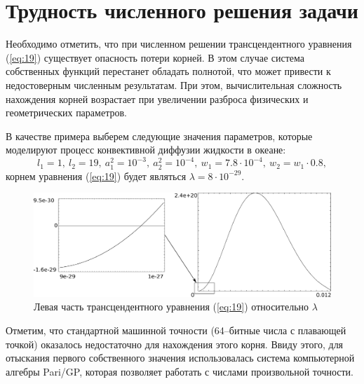 \documentclass[12pt, a4paper]{article}
\begin{document}
\section{Трудность численного решения задачи}
Необходимо отметить, что при численном решении трансцендентного уравнения (\ref{eq:19}) существует опасность потери корней.
В этом случае система собственных функций перестанет обладать полнотой, что может привести к недостоверным численным результатам.
При этом, вычислительная сложность нахождения корней возрастает при увеличении разброса физических и геометрических параметров.

В качестве примера выберем следующие значения параметров, которые моделируют процесс конвективной диффузии жидкости в океане:
\begin{equation*}
  l_1=1,\ l_2=19,\ a_1^2=10^{-3},\ a_2^2=10^{-4},\ w_1=7.8\cdot 10^{-4},\ w_2=w_1 \cdot 0.8,
\end{equation*}
корнем уравнения (\ref{eq:19}) будет являться $\lambda=8 \cdot 10^{-29}$.
\begin{figure}[H]
 \includegraphics[width=16cm]{full.eps}
 \caption{Левая часть трансцендентного уравнения (\ref{eq:19}) относительно $\lambda$}
 \label{fig:2}
\end{figure}
Отметим, что стандартной машинной точности (64--битные числа с плавающей точкой) оказалось недостаточно для нахождения этого корня.
Ввиду этого, для отыскания первого собственного значения использовалась система компьютерной алгебры Pari/GP, 
которая позволяет работать с числами произвольной точности.
\end{document}
